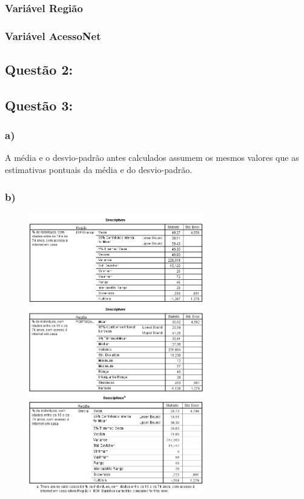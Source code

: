 \documentclass[a4paper,11pt]{article}
\begin{document}
\newpage
\subsubsection{Variável Região}
\subsubsection{Variável AcessoNet}


\newpage
\subsection{Questão 2:}

\newpage
\subsection{Questão 3:}
\subsubsection{a)}
\indent A média e o desvio-padrão antes calculados assumem os mesmos valores que as estimativas pontuais da média e do desvio-padrão.
\newline

\subsubsection{b)}
\begin{figure}[ht!]
\centering
\includegraphics[width=76mm]{IC(EUarea)}
\includegraphics[width=76mm]{IC(PT)}
\includegraphics[width=76mm]{IC(GR)}
\label{overflow}
\end{figure}
\end{document}
